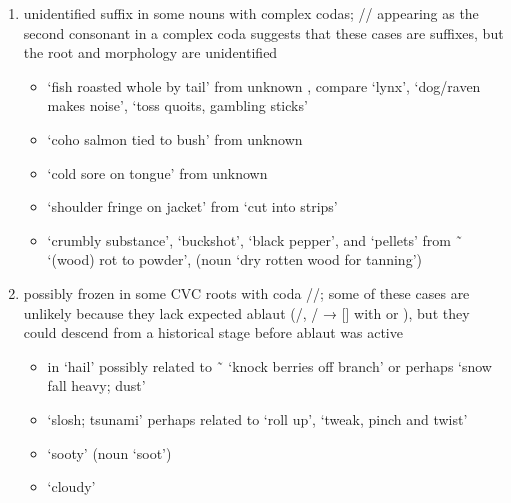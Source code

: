\begin{morphdesc}[resume*=alphalist]
\begin{enumerate}
\begin{itemize}
		\end{itemize}
	\item	unidentified suffix in some nouns with complex codas;
		// appearing as the second consonant in a complex coda suggests that
		these cases are suffixes, but the root and morphology are unidentified
		\begin{itemize}
		\item	{} ‘fish roasted whole by tail’
			from unknown ,
			compare  ‘lynx’,
			 ‘dog/raven makes noise’,
			 ‘toss quoits, gambling sticks’
		\item	{} ‘coho salmon tied to bush’
			from unknown 
		\item	{} ‘cold sore on tongue’
			from unknown 
		\item	{} ‘shoulder fringe on jacket’
			from  ‘cut into strips’
		\item	{} ‘crumbly substance’,
			 ‘buckshot’,
			 ‘black pepper’,
			and  ‘pellets’
			from  \~\  ‘(wood) rot to powder’,
			(noun  ‘dry rotten wood for tanning’)
		\end{itemize}
	\item	possibly frozen in some CVC roots with coda //;
		some of these cases are unlikely because they lack expected ablaut
		(/, / → [] with  or ),
		but they could descend from
		a historical stage before ablaut was active
		\begin{itemize}
		\item	{} in  ‘hail’
			possibly related to  \~\ 
			‘knock berries off branch’
			or perhaps  ‘snow fall heavy; dust’
		\item	{} ‘slosh; tsunami’
			perhaps related to  ‘roll up’,
			 ‘tweak, pinch and twist’
		\item	{} ‘sooty’
			(noun  ‘soot’)
		\item	{} ‘cloudy’

\end{itemize}
\end{enumerate}
\end{morphdesc}
